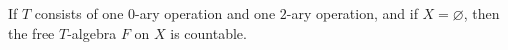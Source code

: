 If $T$ consists of one $0$-ary operation and one $2$-ary operation, and if $X = \varnothing$, then the free $T$-algebra $F$ on $X$ is countable.
